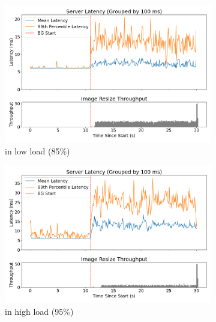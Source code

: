 \begin{figure}[t]
    \centering
    \begin{subfigure}[t]{\columnwidth}
        \includegraphics[width=\columnwidth]{graphs/srv-bg-idle-low.png}
        \caption{\schedidle{} in low load (85\%)}\label{fig:srv-bg-idle-low}
        \vspace{12pt}
    \end{subfigure}
    \hspace{\fill}
    \begin{subfigure}[t]{\columnwidth}
        \includegraphics[width=\columnwidth]{graphs/srv-bg-idle-high.png}
        \caption{\schedidle{} in high load (95\%)}\label{fig:srv-bg-idle-high}
        \vspace{12pt}
    \end{subfigure}
    \vspace{4pt}
    \caption{}\label{fig:srv-bg-idle}
\end{figure}

